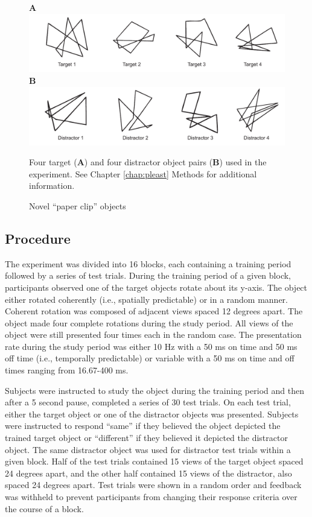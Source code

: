 \documentclass[dwyatte_dissertation.tex]{subfiles}
\begin{document}
\begin{figure}[h!]
\textbf{A} \\
\includegraphics[width=160mm]{figs/bpleast/paperclip_targets.pdf} \\
\textbf{B} \\
\includegraphics[width=160mm]{figs/bpleast/paperclip_distractors.pdf} \\
\caption{Novel ``paper clip'' objects}{Four target (\textbf{A}) and four distractor object pairs (\textbf{B}) used in the experiment. See Chapter \ref{chap:pleast} Methods for additional information.}
\label{fig:paperclip}
\end{figure}

\subsection{Procedure}
The experiment was divided into 16 blocks, each containing a training period followed by a series of test trials. During the training period of a given block, participants observed one of the target objects rotate about its y-axis. The object either rotated coherently (i.e., spatially predictable) or in a random manner. Coherent rotation was composed of adjacent views spaced 12 degrees apart. The object made four complete rotations during the study period. All views of the object were still presented four times each in the random case. The presentation rate during the study period was either 10 Hz with a 50 ms on time and 50 ms off time (i.e., temporally predictable) or variable with a 50 ms on time and off times ranging from 16.67-400 ms. 

Subjects were instructed to study the object during the training period and then after a 5 second pause, completed a series of 30 test trials. On each test trial, either the target object or one of the distractor objects was presented. Subjects were instructed to respond ``same'' if they believed the object depicted the trained target object or ``different'' if they believed it depicted the distractor object. The same distractor object was used for distractor test trials within a given block. Half of the test trials contained 15 views of the target object spaced 24 degrees apart, and the other half contained 15 views of the distractor, also spaced 24 degrees apart. Test trials were shown in a random order and feedback was withheld to prevent participants from changing their response criteria over the course of a block. 
\end{document}
